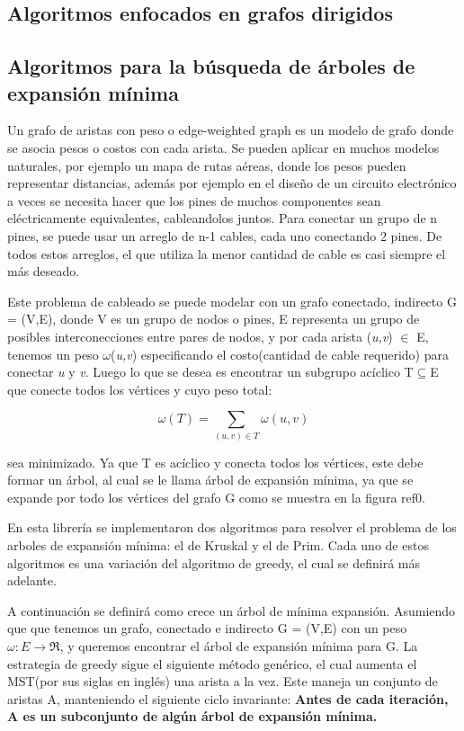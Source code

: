 \documentclass[a4paper, 11pt]{report}
\begin{document}
\subsection{Algoritmos enfocados en grafos dirigidos}
\newpage
\subsection{Algoritmos para la b\'usqueda de \'arboles de expansi\'on m\'inima}
Un grafo de aristas con peso o edge-weighted graph es un modelo de grafo donde se asocia pesos o costos con cada arista. Se pueden aplicar en muchos modelos naturales, por ejemplo un mapa de rutas aéreas, donde los pesos pueden representar distancias, además por ejemplo en el diseño de un circuito electrónico a veces se necesita hacer que los pines  de muchos componentes sean eléctricamente equivalentes, cableandolos juntos. Para conectar un grupo de n pines, se puede usar un arreglo de n-1 cables, cada uno conectando 2 pines. De todos estos arreglos, el que utiliza la menor cantidad de cable es casi siempre el más deseado. 

Este problema de cableado se puede modelar con un grafo conectado, indirecto G = (V,E), donde V es un grupo de nodos o pines, E representa un grupo de posibles interconecciones entre pares de nodos, y por cada arista (\textit{u,v}) $\in$  E, tenemos un peso $\omega$(\textit{u,v}) especificando el costo(cantidad de cable requerido) para conectar \textit{u} y \textit{v}. Luego lo que se desea es encontrar un subgrupo acíclico T$ \subseteq $E que conecte todos los vértices y cuyo peso total:

\begin{equation}
 \omega (T) =  \sum_{(u,v) \in T}  \omega (u,v) 
\end{equation}

sea minimizado. Ya que T es acíclico y conecta todos los vértices, este debe formar un árbol, al cual se le llama árbol de expansión mínima, ya que se expande por todo los vértices del grafo G como se muestra en la figura ref0. 

En esta librería se implementaron dos algoritmos para resolver el problema de los arboles de expansión mínima: el de Kruskal y el de Prim. Cada uno de estos algoritmos es una variación del algoritmo de greedy, el cual se definirá más adelante. 

A continuación se definirá como crece un árbol de mínima expansión. Asumiendo que que tenemos un grafo, conectado e indirecto G = (V,E) con un peso $\omega: E \longrightarrow  \Re$, y queremos encontrar el árbol de expansión mínima para G. La estrategia de greedy sigue el siguiente método genérico, el cual aumenta el MST(por sus siglas en inglés) una arista a la vez. Este maneja un conjunto de aristas A, manteniendo el siguiente ciclo invariante: \textbf{Antes de cada iteración, A es un subconjunto de algún árbol de expansión mínima.}
\end{document}
